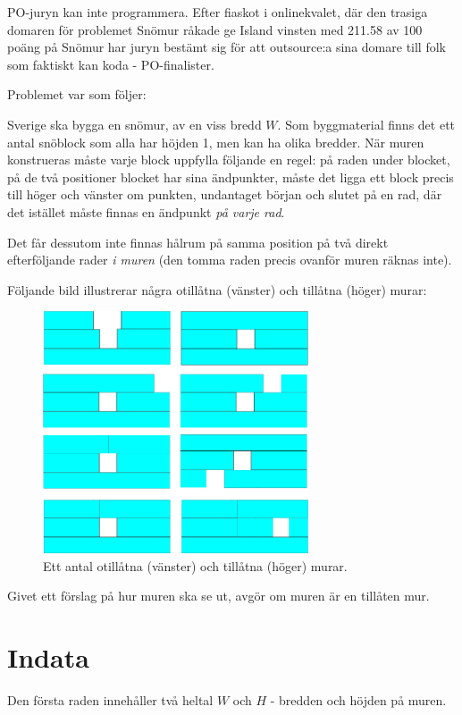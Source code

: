 PO-juryn kan inte programmera. Efter fiaskot i onlinekvalet, där den trasiga domaren för problemet Snömur råkade ge Island vinsten med 211.58 av 100 poäng på Snömur har juryn bestämt sig för att outsource:a sina domare till folk som faktiskt kan koda - PO-finalister.

Problemet var som följer:

Sverige ska bygga en snömur, av en viss bredd $W$.
Som byggmaterial finns det ett antal snöblock som alla har höjden 1, men kan ha olika bredder.
När muren konstrueras måste varje block uppfylla följande en regel: på raden under blocket,
på de två positioner blocket har sina ändpunkter, måste det ligga ett block precis till höger och vänster om punkten,
undantaget början och slutet på en rad, där det istället måste finnas en ändpunkt \emph{på varje rad}.

Det får dessutom inte finnas hålrum på samma position på två direkt efterföljande rader \emph{i muren} (den tomma raden
precis ovanför muren räknas inte).

Följande bild illustrerar några otillåtna (vänster) och tillåtna (höger) murar:

\begin{figure}[h]
	\centering
	\includegraphics[width=0.7\textwidth]{mur.png}
	\caption{Ett antal otillåtna (vänster) och tillåtna (höger) murar.}
\end{figure}

Givet ett förslag på hur muren ska se ut, avgör om muren är en tillåten mur.

\section*{Indata}
Den första raden innehåller två heltal $W$ och $H$ - bredden och höjden på muren.

